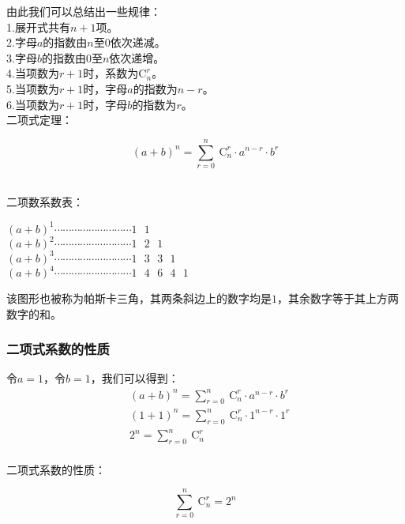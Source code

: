 \documentclass[UTF8]{ctexart}
\begin{document}
\newpage

    由此我们可以总结出一些规律：\\[3mm]
    1.展开式共有$n+1$项。\\[3mm]
    2.字母$a$的指数由$n$至$0$依次递减。\\[3mm]
    3.字母$b$的指数由$0$至$n$依次递增。\\[3mm]
    4.当项数为$r+1$时，系数为$\mathrm{C}_{n}^{r}$。\\[3mm]
    5.当项数为$r+1$时，字母$a$的指数为$n-r$。\\[3mm]
    6.当项数为$r+1$时，字母$b$的指数为$r$。\\[6mm]
    二项式定理：
    \begin{large}
        \begin{equation*}
            (a+b)^n=\sum_{r=0}^{n}~\mathrm{C}_n^r\cdot a^{n-r}\cdot b^r
        \end{equation*}
    \end{large}\\
    二项数系数表：
    \begin{center}
        $(a+b)^1\cdots\cdots\cdots\cdots\cdots\cdots\cdots\cdots\cdots 1~~~1$\\[1mm]
        $(a+b)^2\cdots\cdots\cdots\cdots\cdots\cdots\cdots\cdots\cdots 1~~~2~~~1$\\[1mm]
        $(a+b)^3\cdots\cdots\cdots\cdots\cdots\cdots\cdots\cdots\cdots 1~~~3~~~3~~~1$\\[1mm]
        $(a+b)^4\cdots\cdots\cdots\cdots\cdots\cdots\cdots\cdots\cdots 1~~~4~~~6~~~4~~~1$\\[1mm]
    \end{center}\vspace{8pt}
    该图形也被称为帕斯卡三角，其两条斜边上的数字均是$1$，其余数字等于其上方两数字的和。

\subsubsection{二项式系数的性质}
    令$a=1$，令$b=1$，我们可以得到：\vspace{5pt}
    \setcounter{equation}{0}
    \begin{align}
        &(a+b)^n=\sum_{r=0}^{n}~\mathrm{C}_n^r\cdot a^{n-r}\cdot b^r\\[3mm]
        &(1+1)^n=\sum_{r=0}^{n}~\mathrm{C}_n^r\cdot 1^{n-r}\cdot 1^r\\[3mm]
        &2^n=\sum_{r=0}^{n}~\mathrm{C}_n^r
    \end{align}\\
    二项式系数的性质：
    \begin{large}
        \begin{equation*}
            \sum_{r=0}^{n}~\mathrm{C}_n^r=2^n
        \end{equation*}
    \end{large}
\end{document}
